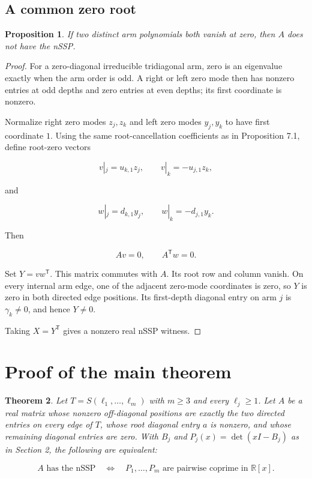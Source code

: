 \documentclass[11pt]{article}
\newtheorem{theorem}{Theorem}[section]
\newtheorem{proposition}[theorem]{Proposition}
\theoremstyle{remark}
\begin{document}
\subsection{A common zero root}

\begin{proposition}

If two distinct arm polynomials both vanish at zero, then $A$ does not have the nSSP.
\end{proposition}

\begin{proof}

For a zero-diagonal irreducible tridiagonal arm, zero is an eigenvalue exactly when the arm order is odd. A right or left zero mode then has nonzero entries at odd depths and zero entries at even depths; its first coordinate is nonzero.

Normalize right zero modes $z_j,z_k$ and left zero modes $y_j,y_k$ to have first coordinate $1$. Using the same root-cancellation coefficients as in Proposition 7.1, define root-zero vectors

\[
v|_j=u_{k,1}z_j,
\qquad
v|_k=-u_{j,1}z_k,
\]

and

\[
w|_j=d_{k,1}y_j,
\qquad
w|_k=-d_{j,1}y_k.
\]

Then

\[
Av=0,
\qquad
A^{\mathsf T}w=0.
\]

Set $Y=vw^{\mathsf T}$. This matrix commutes with $A$. Its root row and column vanish. On every internal arm edge, one of the adjacent zero-mode coordinates is zero, so $Y$ is zero in both directed edge positions. Its first-depth diagonal entry on arm $j$ is $\gamma_k\ne0$, and hence $Y\ne0$.

Taking $X=Y^{\mathsf T}$ gives a nonzero real nSSP witness.
\end{proof}

\section{Proof of the main theorem}

\begin{theorem}

Let $T=S(\ell_1,\ldots,\ell_m)$ with $m\ge3$ and every $\ell_j\ge1$. Let $A$ be a real matrix whose nonzero off-diagonal positions are exactly the two directed entries on every edge of $T$, whose root diagonal entry $a$ is nonzero, and whose remaining diagonal entries are zero. With $B_j$ and $P_j(x)=\det(xI-B_j)$ as in Section 2, the following are equivalent:

\[
A\text{ has the nSSP}
\quad\Longleftrightarrow\quad
P_1,\ldots,P_m\text{ are pairwise coprime in }\mathbb R[x].
\]
\end{theorem}
\end{document}

